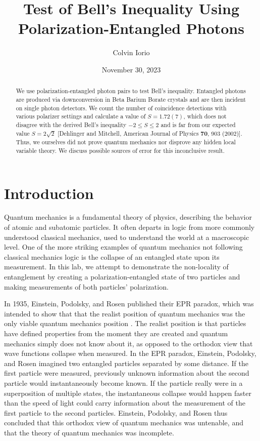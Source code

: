 \documentclass[11pt,letterpaper]{article}
\begin{document}
\title{Test of Bell's Inequality Using Polarization-Entangled Photons}

\author{Colvin Iorio}

\date{November 30, 2023}
\maketitle


\begin{abstract}
    We use polarization-entangled photon pairs to test Bell's inequality. Entangled photons are produced via downconversion in Beta Barium Borate crystals and are then incident on single photon detectors. We count the number of coincidence detections with various polarizer settings and calculate a value of $S = 1.72(7)$, which does not disagree with the derived Bell's inequality $-2 \le S \le 2$ and is far from our expected value $S=2\sqrt{2}$ [Dehlinger and Mitchell, American Journal of Physics \textbf{70}, 903 (2002)]. Thus, we ourselves did not prove quantum mechanics nor disprove any hidden local variable theory. We discuss possible sources of error for this inconclusive result.
\end{abstract}


\section{Introduction}\label{sec intro}

Quantum mechanics is a fundamental theory of physics, describing the behavior of atomic and subatomic particles. It often departs in logic from more commonly understood classical mechanics, used to understand the world at a macroscopic level. One of the more striking examples of quantum mechanics not following classical mechanics logic is the collapse of an entangled state upon its measurement. In this lab, we attempt to demonstrate the non-locality of entanglement by creating a polarization-entangled state of two particles and making measurements of both particles' polarization.

In 1935, Einstein, Podolsky, and Rosen published their EPR paradox, which was intended to show that that the realist position of quantum mechanics was the only viable quantum mechanics position \cite{Griffiths}. The realist position is that particles have defined properties from the moment they are created and quantum mechanics simply does not know about it, as opposed to the orthodox view that wave functions collapse when measured. In the EPR paradox, Einstein, Podolsky, and Rosen imagined two entangled particles separated by some distance. If the first particle were measured, previously unknown information about the second particle would instantaneously become known. If the particle really were in a superposition of multiple states, the instantaneous collapse would happen faster than the speed of light could carry information about the measurement of the first particle to the second particles. Einstein, Podolsky, and Rosen thus concluded that this orthodox view of quantum mechanics was untenable, and that the theory of quantum mechanics was incomplete.
\end{document}
